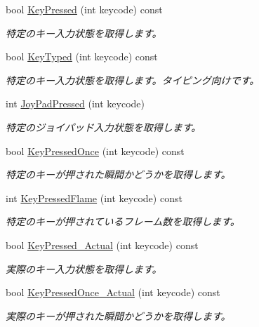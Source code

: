 \begin{DoxyCompactItemize}
bool \hyperlink{class_input_manager_a3f15928d9522586da1b47a2c9a65e453}{Key\+Pressed} (int keycode) const 
\begin{DoxyCompactList}\small\item\em 特定のキー入力状態を取得します。\end{DoxyCompactList}\item 
bool \hyperlink{class_input_manager_abcd73b9fee163ea92ca73c01b149cb18}{Key\+Typed} (int keycode) const 
\begin{DoxyCompactList}\small\item\em 特定のキー入力状態を取得します。タイピング向けです。\end{DoxyCompactList}\item 
int \hyperlink{class_input_manager_a3b9b6280d613b3441fa4a8bac1cef502}{Joy\+Pad\+Pressed} (int keycode)
\begin{DoxyCompactList}\small\item\em 特定のジョイパッド入力状態を取得します。\end{DoxyCompactList}\item 
bool \hyperlink{class_input_manager_a13380875904b6ad54e37f2c727dbe08a}{Key\+Pressed\+Once} (int keycode) const 
\begin{DoxyCompactList}\small\item\em 特定のキーが押された瞬間かどうかを取得します。\end{DoxyCompactList}\item 
int \hyperlink{class_input_manager_a38147ee44dd913964543d91ac41556c6}{Key\+Pressed\+Flame} (int keycode) const 
\begin{DoxyCompactList}\small\item\em 特定のキーが押されているフレーム数を取得します。\end{DoxyCompactList}\item 
bool \hyperlink{class_input_manager_aaa52e91c7a5816ab8680d5620210e66a}{Key\+Pressed\+\_\+\+Actual} (int keycode) const 
\begin{DoxyCompactList}\small\item\em 実際のキー入力状態を取得します。\end{DoxyCompactList}\item 
bool \hyperlink{class_input_manager_a633f4192164eb3ca9e48d9d922df5b6a}{Key\+Pressed\+Once\+\_\+\+Actual} (int keycode) const 
\begin{DoxyCompactList}\small\item\em 実際のキーが押された瞬間かどうかを取得します。\end{DoxyCompactList}\item 

\end{DoxyCompactItemize}
